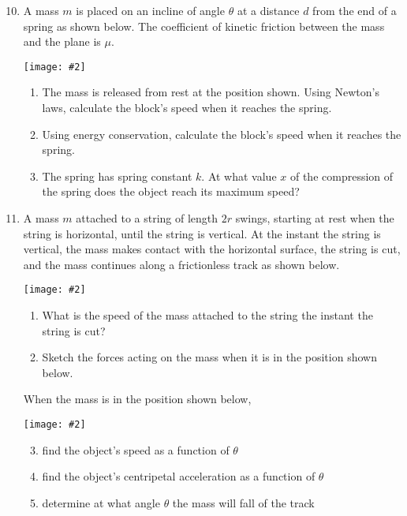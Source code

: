 \documentclass[12pt]{article}
\newcommand{\pic}[2]{\texttt{[image: \#2]}}
\begin{document}
\begin{enumerate}[leftmargin=15pt]
  \setcounter{enumi}{9}
\item A mass $m$ is placed on an incline of angle $\theta$ at a distance $d$
  from the end of a spring as shown below. The coefficient of kinetic friction
  between the mass and the plane is $\mu$.
  \begin{center}
    \pic{.37}{ramp1.png}
  \end{center}
  \begin{enumerate}[noitemsep]
  \item The mass is released from rest at the position shown. Using Newton's
    laws, calculate the block's speed when it reaches the spring.
  \item Using energy conservation, calculate the block's speed when it reaches
    the spring.
    
  \item The spring has spring constant $k$. At what value $x$ of the compression
    of the spring does the object reach its maximum speed?
  \end{enumerate}

\item A mass $m$ attached to a string of length $2r$ swings, starting at rest
  when the string is horizontal, until the string is vertical. At the instant
  the string is vertical, the mass makes contact with the horizontal surface,
  the string is cut, and the mass continues along a frictionless track as shown
  below.
  \begin{center}
    \vspace{-0.2in}\pic{0.4}{string2.png}
  \end{center}
  \begin{enumerate}[noitemsep]
  \item What is the speed of the mass attached to the string the instant the
    string is cut?
  \item Sketch the forces acting on the mass when it is in the position shown
    below.
  \end{enumerate}
  When the mass is in the position shown below,
  \begin{center}
    \pic{0.25}{circle1.png}
  \end{center}
  \begin{enumerate}[noitemsep]
    \setcounter{enumii}{2}
  \item find the object's speed as a function of $\theta$
  \item find the object's centripetal acceleration as a function of $\theta$
  \item determine at what angle $\theta$ the mass will fall of the track
  \end{enumerate}


\end{enumerate}
\end{document}
